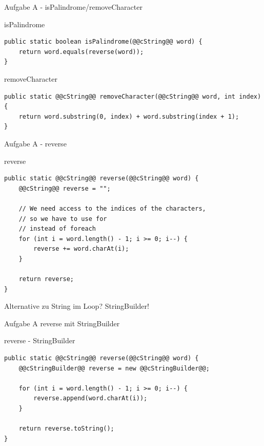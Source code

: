 \documentclass[aspectratio=169]{beamer}
\begin{document}
\begin{frame}[fragile]{Aufgabe A - isPalindrome/removeCharacter}
  \begin{block}{isPalindrome}
    \begin{lstlisting}
public static boolean isPalindrome(@@cString@@ word) {
    return word.equals(reverse(word));
}
    \end{lstlisting}
  \end{block}
  \pause
  \begin{block}{removeCharacter}
    \begin{lstlisting}
public static @@cString@@ removeCharacter(@@cString@@ word, int index) {
    return word.substring(0, index) + word.substring(index + 1);
}
    \end{lstlisting}
  \end{block}
\end{frame}

\begin{frame}[fragile]{Aufgabe A - reverse}
  \begin{block}{reverse}
    \begin{lstlisting}
public static @@cString@@ reverse(@@cString@@ word) {
    @@cString@@ reverse = "";

    // We need access to the indices of the characters,
    // so we have to use for
    // instead of foreach
    for (int i = word.length() - 1; i >= 0; i--) {
        reverse += word.charAt(i);
    }

    return reverse;
}
    \end{lstlisting}
  \end{block}
  \pause
  Alternative zu \color{classcolor}String \color{FGround} im Loop? \pause \color{classcolor}StringBuilder\color{FGround}!
\end{frame}

\begin{frame}[fragile]{Aufgabe A reverse mit StringBuilder}
  \begin{exampleblock}{reverse - StringBuilder}
    \begin{lstlisting}
public static @@cString@@ reverse(@@cString@@ word) {
    @@cStringBuilder@@ reverse = new @@cStringBuilder@@;

    for (int i = word.length() - 1; i >= 0; i--) {
        reverse.append(word.charAt(i));
    }

    return reverse.toString();
}
    \end{lstlisting}
  \end{exampleblock}
\end{frame}
\end{document}
